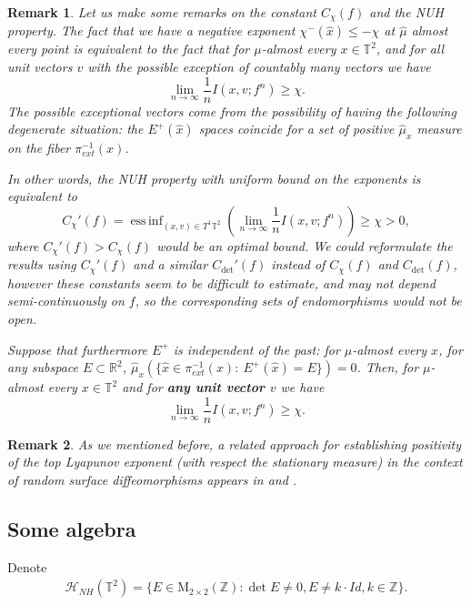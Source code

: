 \documentclass[11pt,letterpaper,reqno]{article}
\newtheorem{remark}{Remark}[section]
\newcommand{\Tor}{\mathbb{T}^2}
\newcommand{\Z}{\mathbb{Z}}
\newcommand{\TT}{\mathbb{T}^2}
\newcommand{\Mat}{\mathrm{M}_{2 \times 2}(\mathbb{Z})}
\DeclareMathOperator*{\essinf}{ess\,inf}
\begin{document}
\begin{remark}
Let us make some remarks on the constant $C_{\chi}(f)$ and the NUH property. The fact that we have a negative exponent $\chi^-(\hat x)\leq-\chi$ at $\hat\mu$ almost every point is equivalent to the fact that for $\mu$-almost every $x\in\TT$, and for all unit vectors $v$ with the possible exception of countably many vectors we have
\[
\lim_{n\rightarrow\infty}\frac 1nI(x,v;f^n)\geq\chi.
\]
The possible exceptional vectors come from the possibility of having the following degenerate situation: the $E^+(\hat x)$ spaces coincide for a set of positive $\hat\mu_x$ measure on the fiber $\pi_{ext}^{-1}(x)$.

In other words, the NUH property with uniform bound on the exponents is equivalent to
\[
C_{\chi}'(f)=\essinf_{(x,v)\in T^1\TT}\left(\lim_{n\rightarrow\infty}\frac 1nI(x,v;f^n)\right)\geq\chi>0,
\]
where $C_{\chi}'(f)>C_{\chi}(f)$ would be an optimal bound. We could reformulate the results using $C_{\chi}'(f)$ and a similar $C_{\det}'(f)$ instead of $C_{\chi}(f)$ and $C_{\det}(f)$, however these constants seem to be difficult to estimate, and may not depend semi-continuously on $f$, so the corresponding sets of endomorphisms would not be open. 

Suppose that furthermore $E^+$ is independent of the past: for $\mu$-almost every $x$, for any subspace $E\subset\mathbb R^2$, $\hat\mu_x\left(\{\hat x\in\pi_{ext}^{-1}(x):\ E^+(\hat x)=E\}\right)=0$. Then, for $\mu$-almost every $x\in\TT$ and for {\bf any unit vector $v$} we have
\[
\lim_{n\rightarrow\infty}\frac 1nI(x,v;f^n)\geq\chi.
\]
\end{remark}

\begin{remark}
As we mentioned before, a related approach for establishing positivity of the top Lyapunov exponent (with respect the stationary measure) in the context of random surface diffeomorphisms appears in \cite{Ch20} and \cite{Liu16}. 
\end{remark}


\subsection{Some algebra}\label{ss:Smith}

Denote
\begin{align}
 \mathscr{H}_{NH}(\Tor)=\{E\in\Mat:\det E \neq 0, E\neq k\cdot Id, k\in\Z\}.
\end{align}
\end{document}
